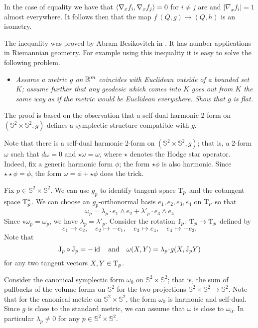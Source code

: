 In the case of equality we have that $\langle\nabla_x f_i,\nabla_x f_j\rangle=0$ for $i\ne j$ are 
and $|\nabla_x f_i|=1$ almost everywhere.
It follows then that the map $f\:(Q,g)\to (Q,h)$ is an isometry.
\qeds

The inequality was proved by Abram Besikovitch in \cite{besicovitch}.
It has number applications in Riemannian geometry.
For example using this inequality it is easy to solve the following problem.
\begin{itemize}
\item {\it Assume a metric $g$ on $\mathbb{R}^m$ coincides with Euclidean outside of a bounded set $K$;
assume further that any geodesic which comes into $K$ goes out from $K$ the same way as if the metric would be Euclidean everywhere. 
Show that $g$ is flat.}
\end{itemize}


The proof is based on the observation that a self-dual harmonic 2-form on $(\mathbb{S}^2\times\mathbb{S}^2,g)$
defines a symplectic structure compatible with $g$.

\medskip

Note that there is a self-dual harmonic 2-form on $(\mathbb{S}^2\times\mathbb{S}^2,g)$;
that is, a 2-form $\omega$ such that $d\omega=0$ and $\star\omega=\omega$,
where $\star$ denotes the Hodge star operator.
Indeed, fix a generic harmonic form $\phi$;
the form $\star\phi$ is also harmonic.
Since $\star\star\phi=\phi$,
the form $\omega=\phi+\star\phi$ does the trick.

Fix $p\in \mathbb{S}^2\times\mathbb{S}^2$.
We can use $g_p$ to identify tangent space $\mathrm{T}_p$ and the cotangent space $\mathrm{T}^*_p$.
We can choose an $g_p$-orthonormal basis $e_1, e_2, e_3, e_4$ on $\mathrm{T}_p$ so that 
\[\omega_p=\lambda_p\cdot e_1\wedge e_2+\lambda'_p\cdot  e_3\wedge e_4\]
Since $\star\omega_p=\omega_p$, we have $\lambda_p=\lambda'_p$.
Consider the rotation $\mathrm{J}_p\colon\mathrm{T}_p\to\mathrm{T}_p$ defined by 
\[ 
e_1\mapsto e_2,
\quad 
e_2\mapsto -e_1,
\quad 
e_3\mapsto e_4,
\quad 
e_4\mapsto-e_3.\]
Note that
\[\mathrm{J}_p\circ\mathrm{J}_p =-\id
\quad\text{and}\quad
\omega(X,Y)=\lambda_p\cdot g(X,\mathrm{J}_pY)\] 
for any two tangent vectors $X,Y\in \mathrm{T}_p$.

Consider the canonical symplectic form $\omega_0$ on $\mathbb{S}^2\times\mathbb{S}^2$;
that is, the sum of pullbacks of the volume forms on $\mathbb{S}^2$  
for the two projections $\mathbb{S}^2\times\mathbb{S}^2\to \mathbb{S}^2$.
Note that for the canonical metric on $\mathbb{S}^2\times\mathbb{S}^2$,
the form $\omega_0$ is harmonic and self-dual. 
Since $g$ is close to the standard metric,
we can assume that $\omega$ is close to $\omega_0$.
In particular $\lambda_p\ne0$ for any $p\in \mathbb{S}^2\times\mathbb{S}^2$.

